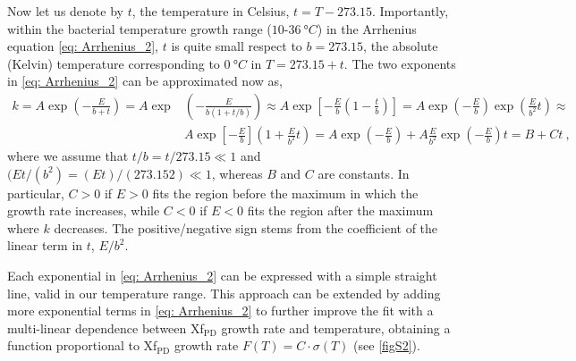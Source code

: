 Now let us denote by $t$, the temperature in Celsius, $t= T-273.15$.
Importantly, within the bacterial temperature growth range
($10$-$\SI{36}{\degree C}$) in the Arrhenius equation \cref{eq: Arrhenius_2},
$t$ is quite small respect to $b = 273.15$, the absolute (Kelvin) temperature
corresponding to $\SI{0}{\degree C}$ in $T = 273.15 + t$. The two exponents in
\cref{eq: Arrhenius_2} can be approximated now as,
\begin{equation}
    \begin{aligned}
        k=A \exp \left(-\frac{E}{b+t}\right)=A \exp & \left(-\frac{E}{b(1+t /
                b)}\right) \approx A \exp
        \left[-\frac{E}{b}\left(1-\frac{t}{b}\right)\right]=A
        \exp \left(-\frac{E}{b}\right) \exp \left(\frac{E}{b^{2}} t\right)
        \approx
        \\
                                                    & A \exp
        \left[-\frac{E}{b}\right]\left(1+\frac{E}{b^{2}} t\right)=A
        \exp \left(-\frac{E}{b}\right)+A \frac{E}{b^{2}} \exp
        \left(-\frac{E}{b}\right)
        t=B+C t \ ,
    \end{aligned}
    \label{eq:tempapprox}
\end{equation}
where we assume that $t/b = t/273.15 \ll1$ and	$(Et/(b^2) = (Et)/(273.152)
    \ll1$, whereas $B$ and $C$ are constants. In particular, $C>0$ if $E>0$
fits
the region before the maximum in which the growth rate increases, while $C<0$
if $E<0$ fits the region after the maximum where $k$ decreases. The
positive/negative sign stems from the coefficient of the linear term in $t$,
$E/b^2$.

Each exponential in \cref{eq: Arrhenius_2} can be expressed with a simple
straight line, valid in our temperature range. This approach can be extended by
adding more exponential terms in \cref{eq: Arrhenius_2} to further improve the
fit with a multi-linear dependence between Xf$_{\textrm{PD}}$ growth rate and
temperature, obtaining a function proportional to Xf$_{\textrm{PD}}$ growth
rate $F(T)=C\cdot\sigma(T)$ (see \cref{figS2}).

